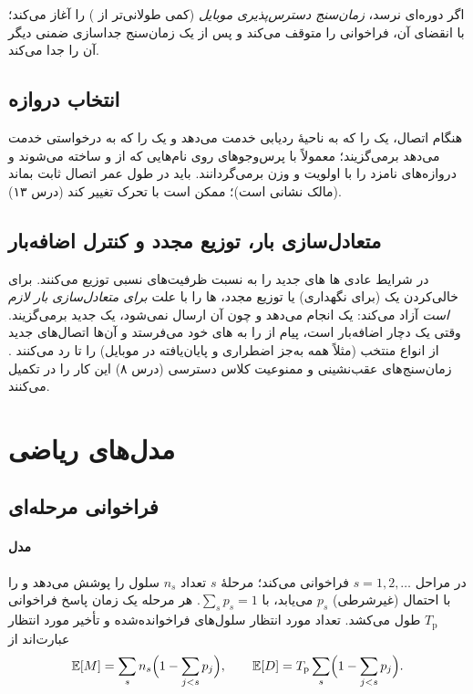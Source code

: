 \documentclass[11pt,a4paper]{article}
\begin{document}
اگر  دوره‌ای نرسد،  \emph{زمان‌سنج دسترس‌پذیری موبایل} (کمی طولانی‌تر از ) را آغاز می‌کند؛ با
انقضای آن،  فراخوانی  را متوقف می‌کند و پس از یک زمان‌سنج جداسازی ضمنی دیگر آن را جدا می‌کند.

\subsection{انتخاب دروازه}
هنگام اتصال،  یک  را که به ناحیهٔ ردیابی  خدمت می‌دهد و یک  را که به 
درخواستی خدمت می‌دهد برمی‌گزیند؛ معمولاً با پرس‌وجوهای  روی نام‌هایی که از  و  ساخته می‌شوند
و دروازه‌های نامزد را با اولویت و وزن برمی‌گردانند.  باید در طول عمر اتصال  ثابت بماند (مالک نشانی
 است)؛  ممکن است با تحرک تغییر کند (درس ۱۳).

\subsection{متعادل‌سازی بار، توزیع مجدد و کنترل اضافه‌بار}
در شرایط عادی ها های جدید را به نسبت ظرفیت‌های نسبی توزیع می‌کنند. برای خالی‌کردن یک  (برای
نگهداری) یا توزیع مجدد،  ها را با علت \emph{ برای متعادل‌سازی بار لازم است} آزاد می‌کند:
 یک  انجام می‌دهد و چون  آن ارسال نمی‌شود،  یک  جدید برمی‌گزیند. وقتی یک
 دچار اضافه‌بار است، پیام  از  را به های خود می‌فرستد و آن‌ها اتصال‌های
جدید  از انواع منتخب (مثلاً همه به‌جز اضطراری و پایان‌یافته در موبایل) را تا  رد می‌کنند
\cite{ts36413}. زمان‌سنج‌های عقب‌نشینی  و ممنوعیت کلاس دسترسی (درس ۸) این کار را در  تکمیل می‌کنند.

\section{مدل‌های ریاضی}

\subsection{فراخوانی مرحله‌ای}\label{sec:paging}
\paragraph{مدل}  در مراحل $s = 1,2,\dots$ فراخوانی می‌کند؛ مرحلهٔ $s$ تعداد $n_s$ سلول را پوشش می‌دهد و  را
با احتمال (غیرشرطی) $p_s$ می‌یابد، با $\sum_s p_s = 1$. هر مرحله یک زمان پاسخ فراخوانی $T_\mathrm{p}$ طول می‌کشد. تعداد
مورد انتظار سلول‌های فراخوانده‌شده و تأخیر مورد انتظار عبارت‌اند از
\begin{equation}\label{eq:paging}
  \mathbb{E}[M] = \sum_{s} n_s\Bigl(1-\sum_{j<s}p_j\Bigr), \qquad
  \mathbb{E}[D] = T_\mathrm{p}\sum_{s}\Bigl(1-\sum_{j<s}p_j\Bigr).
\end{equation}
\end{document}
